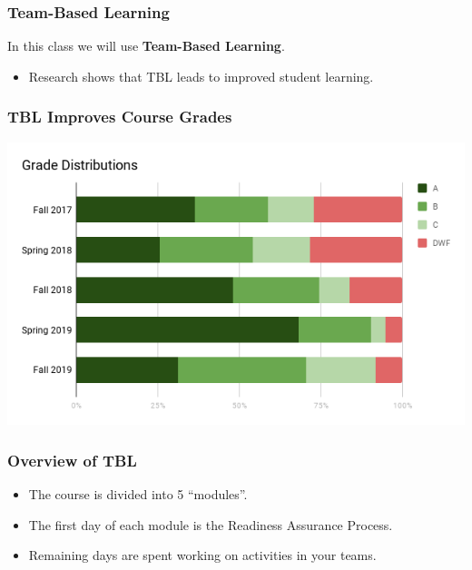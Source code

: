 \documentclass[aspectration=1610]{beamer}
\begin{document}
  \begin{frame}\frametitle{Team-Based Learning}
  In this class we will use {\bf Team-Based Learning}.
  \begin{itemize}
    \item Research shows that TBL leads to improved student learning.
  \end{itemize}

\begin{center}
\end{center}  

  \end{frame}
  

  
  \begin{frame}\frametitle{TBL Improves Course Grades}
  
  \begin{center}
  \includegraphics[scale=0.5]{grades.png}
  \end{center}
  \end{frame}
  
  \begin{frame}\frametitle{Overview of TBL}
  \begin{itemize}
  \item The course is divided into 5 ``modules''.
  \item The first day of each module is the Readiness Assurance Process.
  \item Remaining days are spent working on activities in your teams.
  \end{itemize}
  \end{frame}
\end{document}

